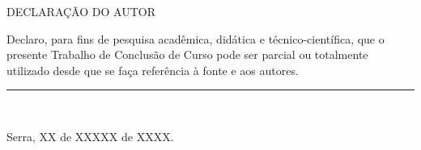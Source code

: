 {
\begin{center}
    \MakeUppercase{Declaração do Autor}
\end{center}

}

\vspace{1cm}

Declaro, para fins de pesquisa acadêmica, didática e técnico-científica, que o presente Trabalho de Conclusão de Curso pode ser parcial ou totalmente utilizado desde que se faça referência à fonte e aos autores.

\vfill

\begin{center}
    \rule{12cm}{1pt} \\
    \imprimirautor    
    
    \vfill
    
    Serra, XX de XXXXX de XXXX.
\end{center}





